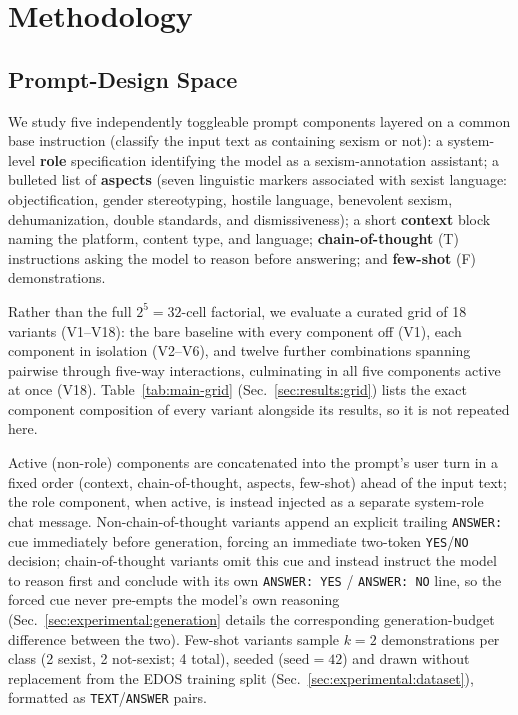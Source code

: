 \section{Methodology}
\label{sec:methodology}

\subsection{Prompt-Design Space}
\label{sec:methodology:prompts}

We study five independently toggleable prompt components layered on a
common base instruction (classify the input text as containing sexism or
not): a system-level \textbf{role} specification identifying the model as
a sexism-annotation assistant; a bulleted list of \textbf{aspects}
(seven linguistic markers associated with sexist language: objectification,
gender stereotyping, hostile language, benevolent sexism, dehumanization,
double standards, and dismissiveness); a short \textbf{context} block
naming the platform, content type, and language; \textbf{chain-of-thought}
(T) instructions asking the model to reason before answering; and
\textbf{few-shot} (F) demonstrations.

Rather than the full $2^5{=}32$-cell factorial, we evaluate a curated grid
of 18 variants (V1--V18): the bare baseline with every component off (V1),
each component in isolation (V2--V6), and twelve further combinations
spanning pairwise through five-way interactions, culminating in all five
components active at once (V18). Table~\ref{tab:main-grid}
(Sec.~\ref{sec:results:grid}) lists the exact component composition of
every variant alongside its results, so it is not repeated here.

Active (non-role) components are concatenated into the prompt's user turn
in a fixed order (context, chain-of-thought, aspects, few-shot) ahead
of the input text; the role component, when active, is instead injected as
a separate system-role chat message. Non-chain-of-thought variants append
an explicit trailing \texttt{ANSWER:} cue immediately before generation,
forcing an immediate two-token \texttt{YES}/\texttt{NO} decision;
chain-of-thought variants omit this cue and instead instruct the model to
reason first and conclude with its own \texttt{ANSWER: YES} /
\texttt{ANSWER: NO} line, so the forced cue never pre-empts the model's own
reasoning (Sec.~\ref{sec:experimental:generation} details the corresponding
generation-budget difference between the two). Few-shot variants sample
$k{=}2$ demonstrations per class (2 sexist, 2 not-sexist; 4 total),
seeded ($\text{seed}{=}42$) and drawn without replacement from the EDOS
training split (Sec.~\ref{sec:experimental:dataset}), formatted as
\texttt{TEXT}/\texttt{ANSWER} pairs.

